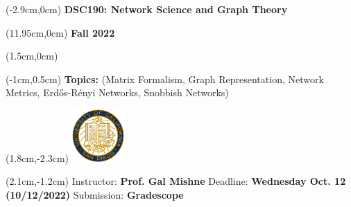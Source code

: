 \documentclass[12pt,letterpaper]{article}
\begin{document}
\thispagestyle{frontPage}
\pagestyle{fancy}
\fancyhead{}
\fancyfoot{}
\renewcommand{\footrulewidth}{0.4pt}%

 

\begin{mdframed}[linewidth=1pt, innerleftmargin=3cm, innerrightmargin=1cm]
\begin{textblock*}{\textwidth}(-2.9cm,0cm)
\textbf{DSC190: Network Science and Graph Theory}
\end{textblock*}

\begin{textblock*}{\textwidth}(11.95cm,0cm)
\textbf{Fall 2022}
\end{textblock*}
\vspace{1cm}

\begin{textblock*}{\textwidth}(1.5cm,0cm)
\end{textblock*}

\vspace{0.3cm}
\begin{textblock*}{\textwidth}(-1cm,0.5cm)
\centering\small{\textbf{Topics:} (Matrix Formalism, Graph Representation, Network Metrics, Erdős-Rényi Networks, Snobbish Networks)}
\end{textblock*}

\vspace{1.8cm}
\begin{textblock*}{\textwidth}(1.8cm,-2.3cm)
\hspace{10cm}\includegraphics[height=2cm]{ucsd.png}
\end{textblock*}

\vspace{1.4cm}
\begin{textblock*}{\textwidth}(2.1cm,-1.2cm)
\hspace{-0.6cm}\small{Instructor: \textbf{Prof. Gal Mishne}} \newline
\small{Deadline: \textbf{Wednesday Oct. 12 (10/12/2022)}} \newline
\small{Submission: \textbf{Gradescope}}
\end{textblock*}
\end{mdframed}
\end{document}
